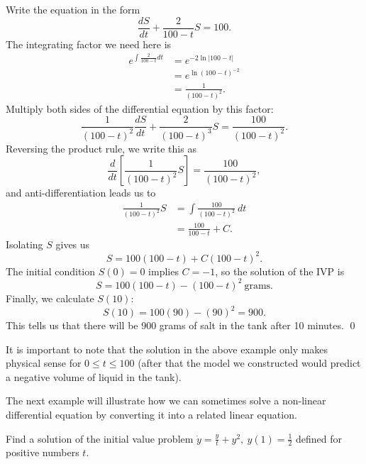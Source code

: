 \documentclass[12pt,letterpaper,twoside]{amsart}
\newcounter{example}
\newcounter{problem}
\newcommand{\example}{\bigskip \noindent {\large {\sc Example \arabic{example}:}} \addtocounter{example}{1}}
\begin{document}
Write the equation in the form
\begin{equation} \frac{dS}{dt} + \frac{2}{100-t} S = 100. \label{example2} \end{equation}
The integrating factor we need here is
\begin{align*} e^{\int \frac{2}{100-t} dt} 
& = e^{-2 \ln |100-t|} \\
& = e^{\ln (100-t)^{-2}} \\
& = \frac{1}{(100-t)^2}.
\end{align*}
Multiply both sides of the differential equation by this factor:
\[ \frac{1}{(100-t)^2}\frac{dS}{dt} + \frac{2}{(100-t)^3} S = \frac{100}{(100-t)^2}.\]
Reversing the product rule, we write this as
\[ \frac{d}{dt} \left[ \frac{1}{(100-t)^2} S \right] = \frac{100}{(100-t)^2},\]
and anti-differentiation leads us to
\begin{align*} \frac{1}{(100-t)^2} S 
& = \int \frac{100}{(100-t)^2} \ dt \\
& = \frac{100}{100-t}+C.
\end{align*}
Isolating $S$ gives us
\[ S = 100(100-t)+C(100-t)^2.\]
The initial condition $S(0)=0$ implies $C=-1$, so the solution of the IVP is
\[ S= 100(100-t)-(100-t)^2 \ \mbox{grams}.\]
Finally,  we calculate $S(10)$:
\[ S(10) = 100(90)-(90)^2=900.\]
This tells us that there will be 900 grams of salt in the tank after 10 minutes.
\qed

It is important to note that the solution in the above example only makes physical sense for $0 \leq t \leq 100$ (after that the model we constructed would predict a negative volume of liquid in the tank).

The next example will illustrate how we can sometimes solve a non-linear differential equation by converting it into a related linear equation.

\example Find a solution of the initial value problem $\dot{y}=\frac{y}{t}+y^2, \ y(1)=\frac{1}{2}$ defined for positive numbers $t$.
\end{document}
